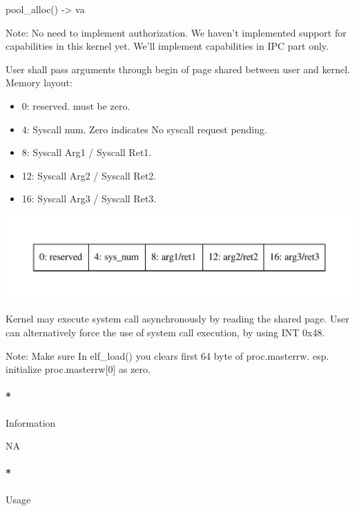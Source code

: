 \documentclass[]{article}
\newenvironment{Shaded}{}{}
\newcommand{\NormalTok}[1]{{#1}}
\providecommand{\tightlist}{%
  \setlength{\itemsep}{0pt}\setlength{\parskip}{0pt}}
\let\oldparagraph\paragraph
\renewcommand{\paragraph}[1]{\oldparagraph{#1}\mbox{}}
\begin{document}
\begin{enumerate}
\begin{itemize}
\begin{Shaded}
\begin{Highlighting}[]
\NormalTok{pool_alloc() -> va}
\end{Highlighting}
\end{Shaded}
  \end{itemize}
\end{enumerate}

Note: No need to implement authorization. We haven't implemented support
for capabilities in this kernel yet. We'll implement capabilities in IPC
part only.

User shall pass arguments through begin of page shared between user and
kernel. Memory layout:

\begin{itemize}
\tightlist
\item
  0: reserved. must be zero.
\item
  4: Syscall num. Zero indicates No syscall request pending.
\item
  8: Syscall Arg1 / Syscall Ret1.
\item
  12: Syscall Arg2 / Syscall Ret2.
\item
  16: Syscall Arg3 / Syscall Ret3.
\end{itemize}

\includegraphics{graphviz-images/47fc597a5f4ea59d064276c7b792ba3ec05d947f.pdf}

Kernel may execute system call asynchronously by reading the shared
page. User can alternatively force the use of system call execution, by
using INT 0x48.

Note: Make sure In elf\_load() you clears first 64 byte of
proc.masterrw. esp. initialize proc.masterrw{[}0{]} as zero.

\paragraph*{Information}\label{information-12}

NA

\paragraph*{Usage}\label{usage-12}
\end{document}
